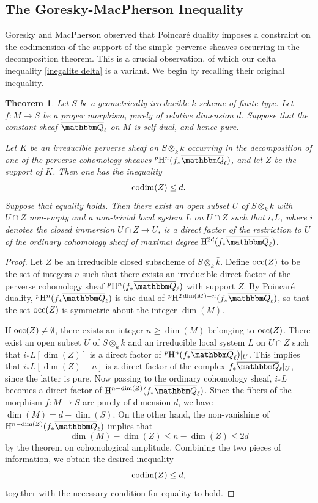 \documentclass[12pt,english]{smfart}
\numberwithin{equation}{subsection}
\newtheorem{theoreme}[equation]{Theorem}
\theoremstyle{remark}
\newcommand\QQ{{\mathbbm Q}}
\newcommand\rmH{{\rm H}}
\newcommand\Ql{{\overline\QQ_\ell}}
\begin{document}
\subsection{The Goresky-MacPherson Inequality}\label{subsection : inegalite GM}

Goresky and MacPherson observed that Poincar\'e duality imposes a constraint on the codimension of the support of the simple perverse sheaves occurring in the decomposition theorem. This is a crucial observation, of which our delta inequality \ref{inegalite delta} is a variant. We begin by recalling their original inequality.

\begin{theoreme}\label{inegalite GM}
Let $S$ be a geometrically irreducible $k$-scheme of finite type. Let $f:M\rightarrow S$ be a proper morphism, purely of relative dimension $d$. Suppose that the constant sheaf $\Ql$ on $M$ is self-dual, and hence pure.

Let $K$ be an irreducible perverse sheaf on $S\otimes_k\bar k$ occurring in the decomposition of one of the perverse cohomology sheaves ${}^p\rmH^n(f_*\Ql)$, and let $Z$ be the support of $K$. Then one has the inequality
$${\rm codim}(Z)\leq d.$$
Suppose that equality holds. Then there exist an open subset $U$ of $S\otimes_k\bar k$ with $U\cap Z$ non-empty and a non-trivial local system $L$ on $U\cap Z$ such that $i_*L$, where $i$ denotes the closed immersion $U\cap Z\rightarrow U$, is a direct factor of the restriction to $U$ of the ordinary cohomology sheaf of maximal degree $\rmH^{2d}(f_*\Ql)$.
\end{theoreme}

\begin{proof}
Let $Z$ be an irreducible closed subscheme of $S\otimes_k\bar k$. Define ${\rm occ}(Z)$ to be the set of integers $n$ such that there exists an irreducible direct factor of the perverse cohomology sheaf ${}^p\rmH^n(f_*\Ql)$ with support $Z$. By Poincar\'e duality, ${}^p\rmH^n(f_*\Ql)$ is the dual of ${}^p\rmH^{2\dim(M)-n}(f_*\Ql)$, so that the set ${\rm occ}(Z)$ is symmetric about the integer $\dim(M)$.

If ${\rm occ}(Z)\not=\emptyset$, there exists an integer $n\geq \dim(M)$ belonging to ${\rm occ}(Z)$. There exist an open subset $U$ of $S\otimes_k\bar k$ and an irreducible local system $L$ on $U\cap Z$ such that $i_*L[\dim(Z)]$ is a direct factor of ${}^p\rmH^n(f_*\Ql)|_U$. This implies that $i_*L[\dim(Z)-n]$ is a direct factor of the complex $f_*\Ql|_U$, since the latter is pure. Now passing to the ordinary cohomology sheaf, $i_*L$ becomes a direct factor of $\rmH^{n-\dim(Z)}(f_*\Ql)$. Since the fibers of the morphism $f:M\rightarrow S$ are purely of dimension $d$, we have $\dim(M)=d+\dim(S)$. On the other hand, the non-vanishing of $\rmH^{n-\dim(Z)}(f_*\Ql)$ implies that
$$\dim(M)-\dim(Z)\leq n-\dim(Z)\leq 2d$$
by the theorem on cohomological amplitude. Combining the two pieces of information, we obtain the desired inequality
$${\rm codim}(Z)\leq d,$$
together with the necessary condition for equality to hold.
\end{proof}
\end{document}

